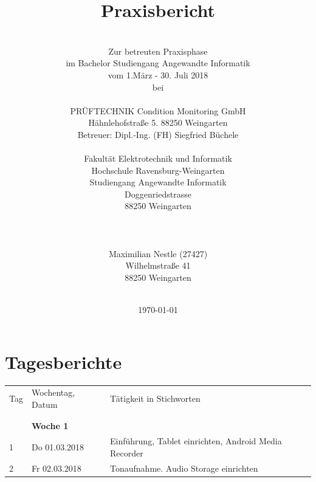 \documentclass{article}
\begin{document}
{\title{\Huge \textbf {Praxisbericht}}
\author{
\\
Zur betreuten Praxisphase\\
 im Bachelor Studiengang Angewandte Informatik\\
vom 1.März - 30. Juli 2018\\
bei\\
\\
PRÜFTECHNIK Condition Monitoring GmbH\\
Hähnlehofstraße 5. 88250 Weingarten\\
Betreuer: Dipl.-Ing. (FH) Siegfried Büchele
\\
\\
Fakultät Elektrotechnik und Informatik\\
Hochschule Ravensburg-Weingarten\\
Studiengang Angewandte Informatik\\
Doggenriedstrasse\\
88250 Weingarten \\
\\
\\
\\
Maximilian Nestle (27427)\\
Wilhelmstraße 41\\
88250 Weingarten\\
\\
 }
\date{\today}
\maketitle
 \newpage
\tableofcontents 
\newpage

\section{Tagesberichte} 
	\begin{tabular}{l|p{2.5cm}|p{15cm}}
	{\large Tag} &{\large  Wochentag, Datum }& {\large Tätigkeit in Stichworten} \\	& & \\
	
 		& & \\
		& \textbf{Woche 1}&\\


		1 & Do 01.03.2018 & 
			Einführung, Tablet einrichten, Android Media Recorder \\

		2 & Fr 02.03.2018	 & 
			Tonaufnahme. Audio Storage einrichten\\
	


\end{tabular}}
\end{document}

